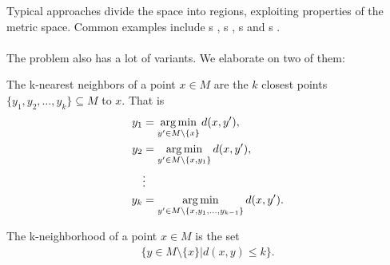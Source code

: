 	Typical approaches divide the space into regions, exploiting properties of the metric space.
	Common examples include {\kdTree}s , {\vpTree}s ,
	{\bkTree}s  and {\coverTree}s .\\\\
	The problem also has a lot of variants. We elaborate on two of them:
	\begin{mydef}
		The \textnormal{k-nearest neighbors} of a point $x \in M$ are the
		$k$ closest points $\{y_1, y_2, \ldots, y_k\} \subseteq M$ to $x$. That is
		\begin{align*}
			y_1	&= \operatorname*{arg\,min}_{y' \in M \setminus \{x\}} d(x, y'),\\
			y_2	&= \operatorname*{arg\,min}_{y' \in M \setminus \{x, y_1\}} d(x, y'),\\
				&\vdots\\
			y_k	&= \operatorname*{arg\,min}_{y' \in M \setminus \{x, y_1, \ldots, y_{k - 1}\}} d(x, y').
		\end{align*}
	\end{mydef}
	\begin{mydef}
		The \textnormal{k-neighborhood} of a point $x \in M$ is the set
		\begin{align*}
			\{y \in M \setminus \{x\} | d(x, y) \le k\}.
		\end{align*}
	\end{mydef}


